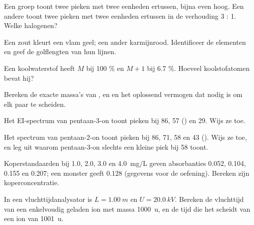 \begin{exercise}[$\star$]\label{exo:b2:mass-spec-atomic:3}
Een groep  toont twee pieken met twee eenheden ertussen, bijna even hoog. Een andere toont twee
pieken met twee eenheden ertussen in de verhouding 3 : 1. Welke halogenen?
\end{exercise}

\begin{exercise}[$\star$]\label{exo:b2:mass-spec-atomic:4}
Een zout kleurt een vlam geel; een ander karmijnrood. Identificeer de elementen en geef de golflengten van hun
lijnen.
\end{exercise}

\begin{exercise}[$\star\star$]\label{exo:b2:mass-spec-atomic:5}
Een koolwaterstof heeft $M$ bij 100 \% en $M+1$ bij 6.7 \%. Hoeveel koolstofatomen bevat hij?
\end{exercise}

\begin{exercise}[$\star\star$]\label{exo:b2:mass-spec-atomic:6}
Bereken de exacte massa's van ,  en  en het oplossend vermogen dat nodig is om
elk paar te scheiden.
\end{exercise}

\begin{exercise}[$\star\star$]\label{exo:b2:mass-spec-atomic:7}
Het EI-spectrum van pentaan-3-on toont pieken bij 86, 57 () en 29. Wijs ze toe.
\end{exercise}

\begin{exercise}[$\star\star$]\label{exo:b2:mass-spec-atomic:8}
Het spectrum van pentaan-2-on toont pieken bij 86, 71, 58 en 43 (). Wijs ze toe, en leg uit
waarom pentaan-3-on slechts een kleine piek bij 58 toont.
\end{exercise}

\begin{exercise}[$\star\star$]\label{exo:b2:mass-spec-atomic:9}
Koperstandaarden bij 1.0, 2.0, 3.0 en \qty{4.0}{mg/L} geven absorbanties 0.052, 0.104, 0.155 en 0.207;
een monster geeft 0.128 (gegevens voor de oefening). Bereken zijn koperconcentratie.
\end{exercise}

\begin{exercise}[$\star\star\star$]\label{exo:b2:mass-spec-atomic:10}
In een vluchttijdanalysator is $L = \qty{1.00}{m}$ en $U = \qty{20.0}{kV}$. Bereken de vluchttijd van
een enkelvoudig geladen ion met massa \qty{1000}{u}, en de tijd die het scheidt van een ion van \qty{1001}{u}.
\end{exercise}

